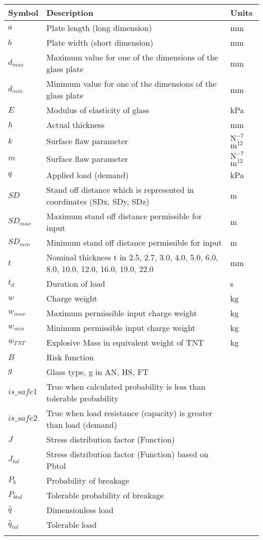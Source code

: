 \documentclass[12pt]{article}
\begin{document}
\begin{longtable*}{l l l}
\toprule
Symbol & Description & Units
\\
\midrule
$a$ & Plate length (long dimension) & mm
\\
$b$ & Plate width (short dimension) & mm
\\
$d_{max}$ & Maximum value for one of the dimensions of the glass plate & mm
\\
$d_{min}$ & Minimum value for one of the dimensions of the glass plate & mm
\\
$E$ & Modulus of elasticity of glass & kPa
\\
$h$ & Actual thickness & mm
\\
$k$ & Surface flaw parameter & $\text{N}^{-7}$$\text{m}^{12}$
\\
$m$ & Surface flaw parameter & $\text{N}^{-7}$$\text{m}^{12}$
\\
$q$ & Applied load (demand) & kPa
\\
$SD$ & Stand off distance which is represented in coordinates (SDx, SDy, SDz) & m
\\
$SD_{max}$ & Maximum stand off distance permissible for input & m
\\
$SD_{min}$ & Minimum stand off distance permissible for input & m
\\
$t$ & Nominal thickness t in {2.5, 2.7, 3.0, 4.0, 5.0, 6.0, 8.0, 10.0, 12.0, 16.0, 19.0, 22.0} & mm
\\
$t_{d}$ & Duration of load & s
\\
$w$ & Charge weight & kg
\\
$w_{max}$ & Maximum permissible input charge weight & kg
\\
$w_{min}$ & Minimum permissible input charge weight & kg
\\
$w_{TNT}$ & Explosive Mass in equivalent weight of TNT & kg
\\
$B$ & Risk function & 
\\
$g$ & Glass type, g in {AN, HS, FT} & 
\\
$is\_safe1$ & True when calculated probability is less than tolerable probability & 
\\
$is\_safe2$ & True when load resistance (capacity) is greater than load (demand) & 
\\
$J$ & Stress distribution factor (Function) & 
\\
$J_{tol}$ & Stress distribution factor (Function) based on Pbtol & 
\\
$P_{b}$ & Probability of breakage & 
\\
$P_{btol}$ & Tolerable probability of breakage & 
\\
$\hat{q}$ & Dimensionless load & 
\\
$\hat{q}_{tol}$ & Tolerable load & 
\\
\bottomrule
\label{Table:ToS}
\end{longtable*}
\end{document}
